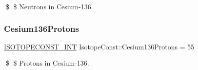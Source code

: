 \$ \$ Neutrons in Cesium-\/136. \mbox{\label{group___isotope_const-_cesium-_cs136_gacea1d12dda734f8208d827ae76bc1df0}} 
\subsubsection{\texorpdfstring{Cesium136\+Protons}{Cesium136Protons}}
{\footnotesize\ttfamily \mbox{\hyperlink{group___isotope_const-_macros_ga5f18360b3e99483a35c32d789e62621c}{I\+S\+O\+T\+O\+P\+E\+C\+O\+N\+S\+T\+\_\+\+I\+NT}} Isotope\+Const\+::\+Cesium136\+Protons = 55}

\$ \$ Protons in Cesium-\/136. 